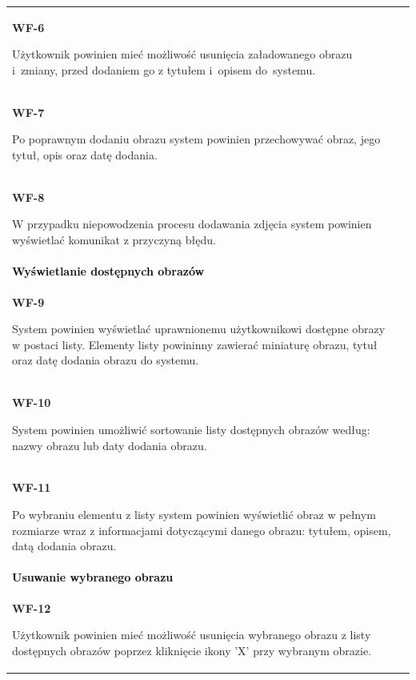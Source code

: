 \documentclass{scrreprt}
\begin{document}
\begin{center}
\begin{tabularx}{\textwidth}[t]{XX}
\textbf{\textcolor{myBlue}{WF-6}}
\hspace{1cm}
\begin{minipage}[t]{1.7\linewidth}%
Użytkownik powinien mieć możliwo\'sć usunięcia załadowanego obrazu i~zmiany, przed dodaniem go z tytułem i~opisem do~systemu. 
\end{minipage}\\

\textbf{\textcolor{myBlue}{WF-7}}
\hspace{1cm}
\begin{minipage}[t]{1.7\linewidth}%
Po poprawnym dodaniu obrazu system powinien przechowywać obraz, jego tytuł, opis oraz datę dodania.
\end{minipage}\\


\textbf{\textcolor{myBlue}{WF-8}}
\hspace{1cm}
\begin{minipage}[t]{1.7\linewidth}%
W przypadku niepowodzenia procesu dodawania zdjęcia system powinien wy\'swietlać komunikat z przyczyną błędu.
\end{minipage}\\
\hline

\textbf{\textcolor{black}{Wy\'swietlanie dostępnych obrazów}} \\
\hline
\textbf{\textcolor{myBlue}{WF-9}}
\hspace{1cm}
\begin{minipage}[t]{1.7\linewidth}%
System powinien wy\'swietlać uprawnionemu użytkownikowi dostępne obrazy w postaci listy. Elementy listy powininny zawierać miniaturę obrazu, tytuł oraz datę dodania obrazu do systemu.
\end{minipage}\\

\textbf{\textcolor{myBlue}{WF-10}}
\hspace{0.8cm}
\begin{minipage}[t]{1.7\linewidth}%
System powinien umożliwić sortowanie listy dostępnych obrazów według: nazwy obrazu lub daty dodania obrazu.
\end{minipage}\\

\textbf{\textcolor{myBlue}{WF-11}}
\hspace{0.8cm}
\begin{minipage}[t]{1.7\linewidth}%
Po wybraniu elementu z listy system powinien wy\'swietlić obraz w pełnym rozmiarze wraz z informacjami dotyczącymi danego obrazu: tytułem, opisem, datą dodania obrazu.
\end{minipage}\\
\hline
\textbf{\textcolor{black}{Usuwanie wybranego obrazu}} \\
\hline
\textbf{\textcolor{myBlue}{WF-12}}
\hspace{0.8cm}
\begin{minipage}[t]{1.7\linewidth}%
Użytkownik powinien mieć możliwo\'sć usunięcia wybranego obrazu z listy dostępnych obrazów poprzez kliknięcie ikony 'X' przy wybranym obrazie. 
\end{minipage}\\


\end{tabularx}
\end{center}
\end{document}
